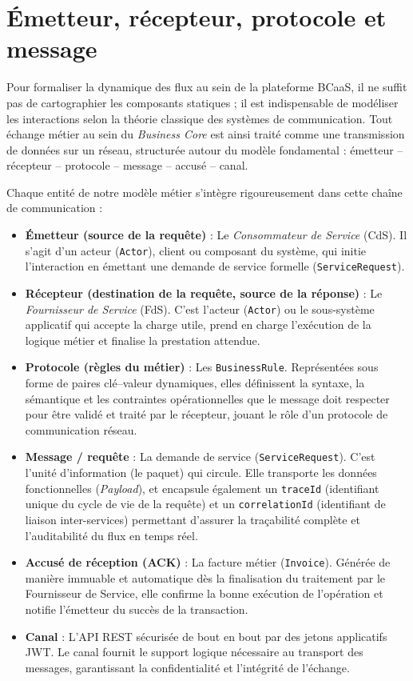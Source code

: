\section{Émetteur, récepteur, protocole et message}
\label{sec:emetteur_recepteur}

Pour formaliser la dynamique des flux au sein de la plateforme BCaaS, il ne suffit pas de cartographier les composants statiques ; il est indispensable de modéliser les interactions selon la théorie classique des systèmes de communication. Tout échange métier au sein du \emph{Business Core} est ainsi traité comme une transmission de données sur un réseau, structurée autour du modèle fondamental : émetteur -- récepteur -- protocole -- message -- accusé -- canal.

Chaque entité de notre modèle métier s'intègre rigoureusement dans cette chaîne de communication :
\begin{itemize}
  \item \textbf{Émetteur (source de la requête)} : Le \emph{Consommateur de Service} (CdS). Il s'agit d'un acteur (\texttt{Actor}), client ou composant du système, qui initie l'interaction en émettant une demande de service formelle (\texttt{ServiceRequest}).
  \item \textbf{Récepteur (destination de la requête, source de la réponse)} : Le \emph{Fournisseur de Service} (FdS). C'est l'acteur (\texttt{Actor}) ou le sous-système applicatif qui accepte la charge utile, prend en charge l'exécution de la logique métier et finalise la prestation attendue.
  \item \textbf{Protocole (règles du métier)} : Les \texttt{BusinessRule}. Représentées sous forme de paires clé--valeur dynamiques, elles définissent la syntaxe, la sémantique et les contraintes opérationnelles que le message doit respecter pour être validé et traité par le récepteur, jouant le rôle d'un protocole de communication réseau.
  \item \textbf{Message / requête} : La demande de service (\texttt{ServiceRequest}). C'est l'unité d'information (le paquet) qui circule. Elle transporte les données fonctionnelles (\emph{Payload}), et encapsule également un \texttt{traceId} (identifiant unique du cycle de vie de la requête) et un \texttt{correlationId} (identifiant de liaison inter-services) permettant d'assurer la traçabilité complète et l'auditabilité du flux en temps réel.
  \item \textbf{Accusé de réception (ACK)} : La facture métier (\texttt{Invoice}). Générée de manière immuable et automatique dès la finalisation du traitement par le Fournisseur de Service, elle confirme la bonne exécution de l'opération et notifie l'émetteur du succès de la transaction.
  \item \textbf{Canal} : L'API REST sécurisée de bout en bout par des jetons applicatifs JWT. Le canal fournit le support logique nécessaire au transport des messages, garantissant la confidentialité et l'intégrité de l'échange.
\end{itemize}
